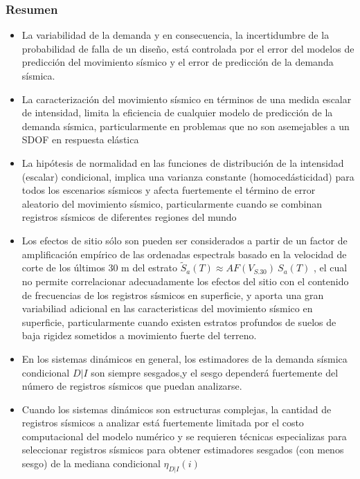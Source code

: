 \documentclass[
]{krantz}
\begin{document}
\hypertarget{resumen}{%
\subsubsection*{Resumen}\label{resumen}}

\begin{itemize}
\item
  La variabilidad de la demanda y en consecuencia, la incertidumbre de la probabilidad de falla de un diseño, está controlada por el error del modelos de predicción del movimiento sísmico y el error de predicción de la demanda sísmica.
\item
  La caracterización del movimiento sísmico en términos de una medida escalar de intensidad, limita la eficiencia de cualquier modelo de predicción de la demanda sísmica, particularmente en problemas que no son asemejables a un SDOF en respuesta elástica
\item
  La hipótesis de normalidad en las funciones de distribución de la intensidad (escalar) condicional, implica una varianza constante (homocedásticidad) para todos los escenarios sísmicos y afecta fuertemente el término de error aleatorio del movimiento sísmico, particularmente cuando se combinan registros sísmicos de diferentes regiones del mundo
\item
  Los efectos de sitio sólo son pueden ser considerados a partir de un factor de amplificación empírico de las ordenadas espectrals basado en la velocidad de corte de los últimos 30 m del estrato \(\tilde S_a(T) \approx AF(V_{S.30}) \ S_a(T)\) , el cual no permite correlacionar adecuadamente los efectos del sitio con el contenido de frecuencias de los registros sísmicos en superficie, y aporta una gran variabiliad adicional en las caracteristicas del movimiento sísmico en superficie, particularmente cuando existen estratos profundos de suelos de baja rigidez sometidos a movimiento fuerte del terreno.
\item
  En los sistemas dinámicos en general, los estimadores de la demanda sísmica condicional \(D|I\) son siempre sesgados,y el sesgo dependerá fuertemente del número de registros sísmicos que puedan analizarse.
\item
  Cuando los sistemas dinámicos son estructuras complejas, la cantidad de registros sísmicos a analizar está fuertemente limitada por el costo computacional del modelo numérico y se requieren técnicas especializas para seleccionar registros sísmicos para obtener estimadores sesgados (con menos sesgo) de la mediana condicional \(\eta_{D|I}(i)\)
\end{itemize}
\end{document}
